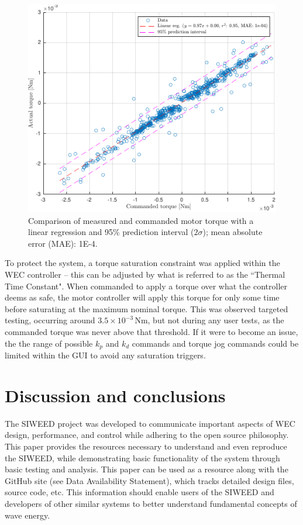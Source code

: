 \documentclass[hardware,article,submit,pdftex,moreauthors]{Definitions/mdpi}
\begin{document}
\begin{figure}[tb]
  \centering
  \includegraphics[width=1\textwidth]{diagrams/PDverification.pdf}
  \caption{Comparison of measured and commanded motor torque with a linear regression and 95\% prediction interval ($2\sigma$); mean absolute error (MAE): 1E-4.}
  \label{fig:TorqueCommanded}
\end{figure}

To protect the system, a torque saturation constraint was applied within the WEC controller -- this can be adjusted by what is referred to as the ``Thermal Time Constant".
When commanded to apply a torque over what the controller deems as safe, the motor controller will apply this torque for only some time before saturating at the maximum nominal torque.
This was observed targeted testing, occurring around $3.5\times 10^{-3}$\,Nm, but not during any user tests, as the commanded torque was never above that threshold.
If it were to become an issue, the the range of possible $k_p$ and $k_d$ commands and torque jog commands could be limited within the GUI to avoid any saturation triggers.

\section{Discussion and conclusions}
The SIWEED project was developed to communicate important aspects of WEC design, performance, and control while adhering to the open source philosophy.
This paper provides the resources necessary to understand and even reproduce the SIWEED, while demonstrating basic functionality of the system through basic testing and analysis.
This paper can be used as a resource along with the GitHub site (see Data Availability Statement), which tracks detailed design files, source code, etc.
This information should enable users of the SIWEED and developers of other similar systems to better understand fundamental concepts of wave energy.
\end{document}
